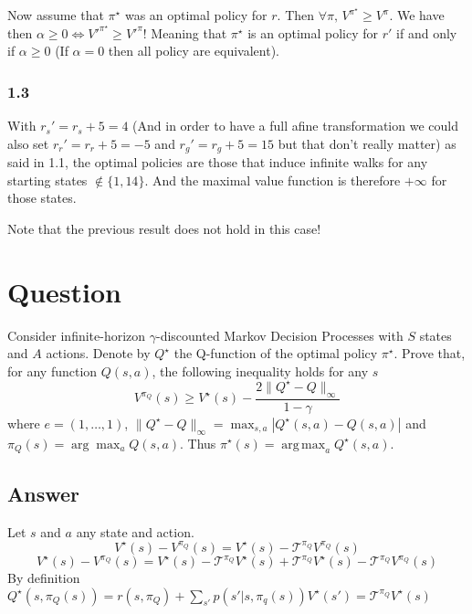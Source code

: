 \documentclass[a4paper]{article}
\DeclareMathOperator*{\argmax}{\arg\,\max}
\begin{document}
Now assume that $\pi^\star$ was an optimal policy for $r$. Then $\forall \pi,\, V^{\pi^\star} \ge V^{\pi}$. We have then
$\alpha \ge 0 \Leftrightarrow V'^{\pi^\star} \ge  V'^\pi$!
Meaning that $\pi^\star$ is an optimal policy for $r'$ if and only if $\alpha \ge 0$ (If $\alpha = 0$ then all policy are equivalent).

\subsubsection*{1.3}
With $r_s' = r_s + 5 = 4$ (And in order to have a full afine transformation we
could also set $r_r' = r_r + 5 = -5$ and $r_g' = r_g + 5 = 15$ but that don't really matter) as said in 1.1, the optimal policies are those
that induce infinite walks for any starting states $\notin \{1,14\}$. And the maximal value function is therefore $+\infty$ for those states.

Note that the previous result does not hold in this case!


\section{Question}
Consider infinite-horizon $\gamma$-discounted Markov Decision Processes with $S$ states and $A$ actions. Denote by $Q^\star$ the Q-function of the optimal policy $\pi^\star$. Prove that, for any function $Q(s,a)$, the following inequality holds for any $s$
\[
    V^{\pi_Q}(s) \geq V^\star(s) - \frac{2 \|Q^\star - Q\|_{\infty}}{1-\gamma}
\]
where $e = (1, \ldots, 1)$, $\|Q^\star - Q\|_{\infty} = \max_{s,a} |Q^\star(s,a) - Q(s,a)|$ and $\pi_Q(s)=\arg\max_a Q(s,a)$. Thus $\pi^\star(s) = \argmax_a Q^\star(s,a)$.

\subsection*{Answer}
Let $s$ and $a$ any state and action.
$$V^\star(s)-V^{\pi_{Q}}(s) = V^\star(s) - \mathcal{T}^{\pi_{Q}}V^{\pi_{Q}}(s)$$
$$V^\star(s)-V^{\pi_{Q}}(s) = V^\star(s) - \mathcal{T}^{\pi_{Q}}V^\star(s) + \mathcal{T}^{\pi_{Q}}V^{\star}(s) - \mathcal{T}^{\pi_{Q}}V^{\pi_{Q}}(s)$$
By definition $Q^\star(s, \pi_Q(s)) = r(s, \pi_Q) + \sum_{s'} p(s'|s, \pi_q(s)) V^\star(s') = \mathcal{T}^{\pi_{Q}}V^\star(s)$
\end{document}
